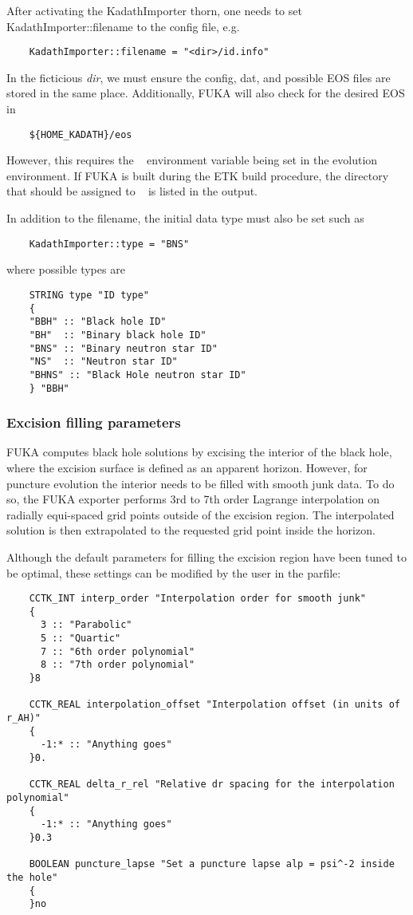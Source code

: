 After activating the KadathImporter thorn, one needs to set KadathImporter::filename to the config file, e.g.
\begin{verbatim}
    KadathImporter::filename = "<dir>/id.info"
\end{verbatim}
In the ficticious \textit{dir}, we must ensure the config, dat, and possible EOS files are stored in the same place.  
Additionally, FUKA will also check for the desired EOS in
\begin{verbatim}
    ${HOME_KADATH}/eos
\end{verbatim}
However, this requires the \hk~ environment variable being set in the evolution environment.  If FUKA is built during
the ETK build procedure, the directory that should be assigned to \hk~ is listed in the output.

In addition to the filename, the initial data type must also be set such as
\begin{verbatim}
    KadathImporter::type = "BNS"
\end{verbatim}
where possible types are 
\begin{verbatim}
    STRING type "ID type"
    {
    "BBH" :: "Black hole ID"
    "BH"  :: "Binary black hole ID"
    "BNS" :: "Binary neutron star ID"
    "NS"  :: "Neutron star ID"
    "BHNS" :: "Black Hole neutron star ID"
    } "BBH"
\end{verbatim}

\subsubsection*{Excision filling parameters}
FUKA computes black hole solutions by excising the interior of the black hole, where
the excision surface is defined as an apparent horizon. However, for puncture evolution
the interior needs to be filled with smooth junk data.  To do so, the FUKA exporter
performs 3rd to 7th order Lagrange interpolation on radially equi-spaced grid points
outside of the excision region. The interpolated solution is then extrapolated
to the requested grid point inside the horizon.

Although the default parameters for filling the excision region have been tuned to be
optimal, these settings can be modified by the user in the parfile:
\begin{verbatim}
    CCTK_INT interp_order "Interpolation order for smooth junk"
    {
      3 :: "Parabolic"
      5 :: "Quartic"
      7 :: "6th order polynomial"
      8 :: "7th order polynomial"
    }8
    
    CCTK_REAL interpolation_offset "Interpolation offset (in units of r_AH)"
    {
      -1:* :: "Anything goes"
    }0.
    
    CCTK_REAL delta_r_rel "Relative dr spacing for the interpolation polynomial"
    {
      -1:* :: "Anything goes"
    }0.3
    
    BOOLEAN puncture_lapse "Set a puncture lapse alp = psi^-2 inside the hole"
    {
    }no
\end{verbatim}

